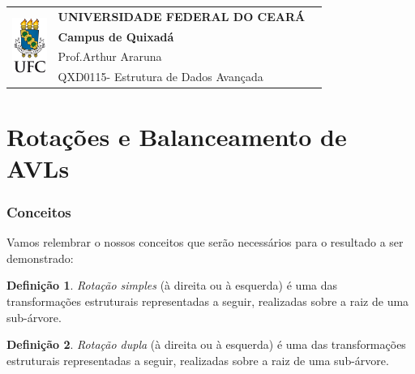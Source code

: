 \documentclass[11pt,twoside]{article}
\theoremstyle{definition}
\newtheorem{definition}{Definição}[section]
\def\disciplinacodigotext{QXD0115}
\def\disciplinanometext{Estrutura de Dados Avançada}
\def\provatitle{Rotações e Balanceamento de AVLs}
\def\professorabbrv{Prof.}
\def\professornometext{Arthur Araruna}
\begin{document}
\noindent
\begin{minipage}{\textwidth}
	\begin{tabularx}{\textwidth}{cXc}
		\multirow{4}{*}{\includegraphics[height=1.8cm]{../brasaoufc.pdf}} & {\bf UNIVERSIDADE FEDERAL DO CEARÁ}         & \multirow{3}{*}{} \\
		                                                                  & {\bf Campus de Quixadá}                     &                   \\
		                                                                  & \professorabbrv\enspace\professornometext   &                   \\
		                                                                  & \disciplinacodigotext - \disciplinanometext & {}                \\
	\end{tabularx}
\end{minipage}

\part*{\provatitle}

\section{Conceitos}

Vamos relembrar o nossos conceitos que serão necessários para o resultado a ser demonstrado:

\begin{definition}
	\emph{Rotação simples} (à direita ou à esquerda) é uma das transformações estruturais representadas a seguir, realizadas sobre a raiz de uma sub-árvore.

	\begin{figure}[h]
		\centering
		\caption{\label{fig:rot-simples}}
		
	\end{figure}
\end{definition}

\begin{definition}
	\emph{Rotação dupla} (à direita ou à esquerda) é uma das transformações estruturais representadas a seguir, realizadas sobre a raiz de uma sub-árvore.

	\begin{figure}[h]
		\centering
		\caption{\label{fig:rot-duplas}}
		
	\end{figure}
\end{definition}
\end{document}
